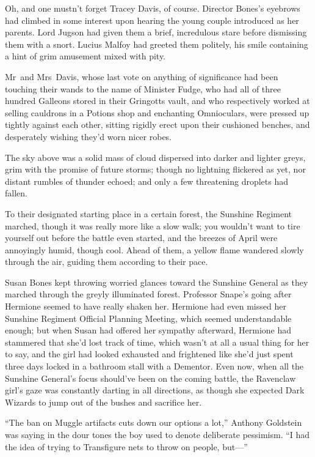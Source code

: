 Oh, and one mustn’t forget Tracey Davis, of course. Director Bones’s eyebrows had climbed in some interest upon hearing the young couple introduced as her parents. Lord Jugson had given them a brief, incredulous stare before dismissing them with a snort. Lucius Malfoy had greeted them politely, his smile containing a hint of grim amusement mixed with pity.

Mr~and Mrs~Davis, whose last vote on anything of significance had been touching their wands to the name of Minister Fudge, who had all of three hundred Galleons stored in their Gringotts vault, and who respectively worked at selling cauldrons in a Potions shop and enchanting Omnioculars, were pressed up tightly against each other, sitting rigidly erect upon their cushioned benches, and desperately wishing they’d worn nicer robes.

The sky above was a solid mass of cloud dispersed into darker and lighter greys, grim with the promise of future storms; though no lightning flickered as yet, nor distant rumbles of thunder echoed; and only a few threatening droplets had fallen.

\later

To their designated starting place in a certain forest, the Sunshine Regiment marched, though it was really more like a slow walk; you wouldn’t want to tire yourself out before the battle even started, and the breezes of April were annoyingly humid, though cool. Ahead of them, a yellow flame wandered slowly through the air, guiding them according to their pace.

Susan Bones kept throwing worried glances toward the Sunshine General as they marched through the greyly illuminated forest. Professor Snape’s going after Hermione seemed to have really shaken her. Hermione had even missed her Sunshine Regiment Official Planning Meeting, which seemed understandable enough; but when Susan had offered her sympathy afterward, Hermione had stammered that she’d lost track of time, which wasn’t at all a usual thing for her to say, and the girl had looked exhausted and frightened like she’d just spent three days locked in a bathroom stall with a Dementor. Even now, when all the Sunshine General’s focus should’ve been on the coming battle, the Ravenclaw girl’s gaze was constantly darting in all directions, as though she expected Dark Wizards to jump out of the bushes and sacrifice her.

“The ban on Muggle artifacts cuts down our options a lot,” Anthony Goldstein was saying in the dour tones the boy used to denote deliberate pessimism. “I had the idea of trying to Transfigure nets to throw on people, but—”

